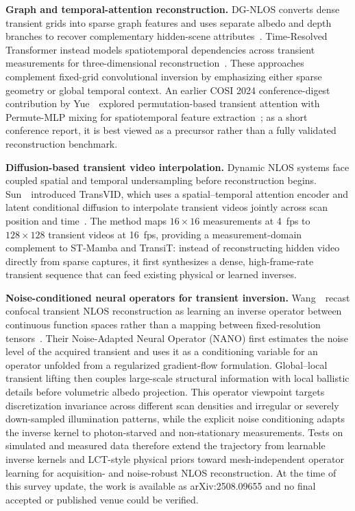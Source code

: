 \vspace{0.8mm}
\noindent \textbf{Graph and temporal-attention reconstruction.}
DG-NLOS converts dense transient grids into sparse graph features and uses separate albedo and depth branches to recover complementary hidden-scene attributes~\cite{suDualBranchGraphNLOS2025}. Time-Resolved Transformer instead models spatiotemporal dependencies across transient measurements for three-dimensional reconstruction~\cite{liTimeResolvedTransformer2025}. These approaches complement fixed-grid convolutional inversion by emphasizing either sparse geometry or global temporal context. An earlier COSI 2024 conference-digest contribution by Yue~\etal~explored permutation-based transient attention with Permute-MLP mixing for spatiotemporal feature extraction~\cite{yuePermutationTransientAttention2024}; as a short conference report, it is best viewed as a precursor rather than a fully validated reconstruction benchmark.

\vspace{0.8mm}
\noindent \textbf{Diffusion-based transient video interpolation.}
Dynamic NLOS systems face coupled spatial and temporal undersampling before reconstruction begins. Sun~\etal~introduced TransVID, which uses a spatial--temporal attention encoder and latent conditional diffusion to interpolate transient videos jointly across scan position and time~\cite{sunTransVID2026}. The method maps $16\times16$ measurements at 4~fps to $128\times128$ transient videos at 16~fps, providing a measurement-domain complement to ST-Mamba and TransiT: instead of reconstructing hidden video directly from sparse captures, it first synthesizes a dense, high-frame-rate transient sequence that can feed existing physical or learned inverses.

\vspace{0.8mm}
\noindent \textbf{Noise-conditioned neural operators for transient inversion.}
Wang~\etal~recast confocal transient NLOS reconstruction as learning an inverse operator between continuous function spaces rather than a mapping between fixed-resolution tensors~\cite{wangNoiseAdaptedNeuralOperator2025}. Their Noise-Adapted Neural Operator (NANO) first estimates the noise level of the acquired transient and uses it as a conditioning variable for an operator unfolded from a regularized gradient-flow formulation. Global--local transient lifting then couples large-scale structural information with local ballistic details before volumetric albedo projection. This operator viewpoint targets discretization invariance across different scan densities and irregular or severely down-sampled illumination patterns, while the explicit noise conditioning adapts the inverse kernel to photon-starved and non-stationary measurements. Tests on simulated and measured data therefore extend the trajectory from learnable inverse kernels and LCT-style physical priors toward mesh-independent operator learning for acquisition- and noise-robust NLOS reconstruction. At the time of this survey update, the work is available as arXiv:2508.09655 and no final accepted or published venue could be verified.

